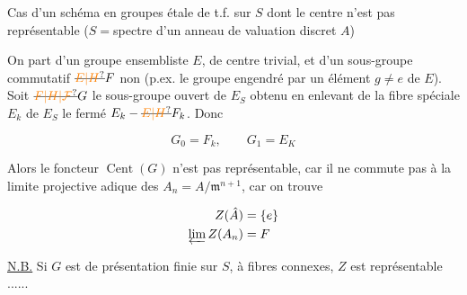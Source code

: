 

Cas d'un schéma en groupes  étale de t.f. sur $S$
dont le centre n'est pas représentable
($S={}$spectre d'un anneau de valuation
discret $A$)

On part d'un groupe ensembliste $E$,
de centre trivial, et d'un sous-groupe commutatif $\deleted{\unsure{E|H}}F$ non   (p.ex. le groupe engendré
par un élément $g\ne e$ de $E$). Soit
$\deleted{\unsure{F|H|\mathcal F}}G$ le sous-groupe ouvert de $E_S$ obtenu
en enlevant de la fibre spéciale
$E_k$ de $E_S$ le fermé $E_k-\deleted{\unsure{E|H}}F_k$. Donc

\[
G_0=F_k,\qquad G_1=E_K
\]

Alors le foncteur $\operatorname{Cent}(G)$ n'est pas
représentable, car il ne commute
pas à la limite projective adique
des $A_n=A/\mathfrak m^{n+1}$, car on trouve

\[
\begin{aligned}
Z(\hat A)&=\{e\}\\
\varprojlim Z(A_n)&=F
\end{aligned}
\]

\uline{N.B.} Si $G$ est  de présentation finie sur $S$, à fibres connexes,
 $Z$ est représentable ......

